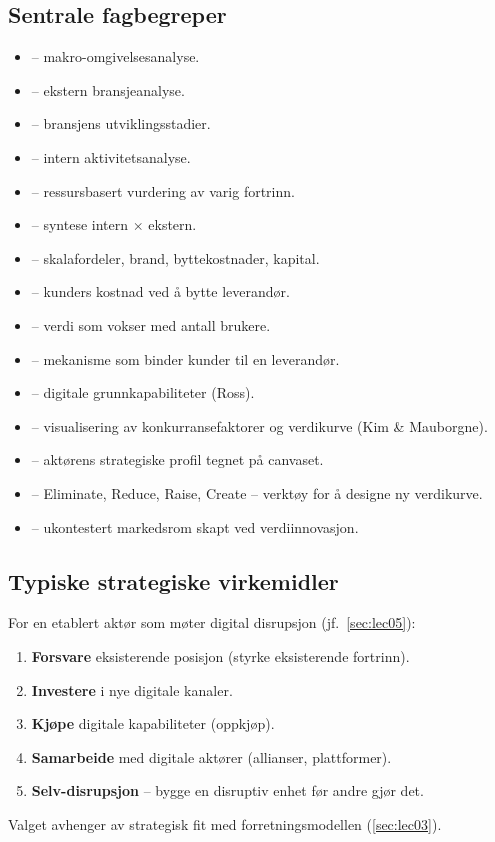 \subsection{Sentrale fagbegreper}\label{terms:lec02}
\begin{itemize}
  \item {} -- makro-omgivelsesanalyse.
  \item {} -- ekstern bransjeanalyse.
  \item {} -- bransjens utviklingsstadier.
  \item {} -- intern aktivitetsanalyse.
  \item {} -- ressursbasert vurdering av varig fortrinn.
  \item {} -- syntese intern $\times$ ekstern.
  \item {} -- skalafordeler, brand, byttekostnader, kapital.
  \item {} -- kunders kostnad ved å bytte leverandør.
  \item {} -- verdi som vokser med antall brukere.
  \item {} -- mekanisme som binder kunder til en leverandør.
  \item {} -- digitale grunnkapabiliteter (Ross).
  \item {} -- visualisering av konkurransefaktorer og
    verdikurve (Kim \& Mauborgne).
  \item {} -- aktørens strategiske profil tegnet på canvaset.
  \item {} -- Eliminate, Reduce, Raise,
    Create -- verktøy for å designe ny verdikurve.
  \item {} -- ukontestert markedsrom skapt ved verdiinnovasjon.
\end{itemize}

\subsection{Typiske strategiske virkemidler}
For en etablert aktør som møter digital disrupsjon (jf.\ \autoref{sec:lec05}):
\begin{enumerate}
  \item \textbf{Forsvare} eksisterende posisjon (styrke eksisterende fortrinn).
  \item \textbf{Investere} i nye digitale kanaler.
  \item \textbf{Kjøpe} digitale kapabiliteter (oppkjøp).
  \item \textbf{Samarbeide} med digitale aktører (allianser, plattformer).
  \item \textbf{Selv-disrupsjon} -- bygge en disruptiv enhet før andre gjør det.
\end{enumerate}
Valget avhenger av strategisk fit med forretningsmodellen (\autoref{sec:lec03}).

